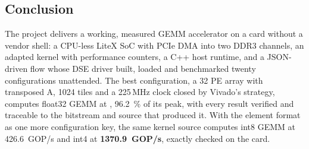 \subsection{Conclusion}
The project delivers a working, measured GEMM accelerator on a card without a vendor shell: a CPU-less LiteX SoC
with PCIe DMA into two DDR3 channels, an adapted  kernel with performance counters, a C++ host
runtime, and a JSON-driven flow whose DSE driver built, loaded and benchmarked twenty configurations unattended. The
best configuration, a 32 PE array with transposed A, 1024 tiles and a 225\,MHz clock closed by Vivado's
 strategy, computes float32 GEMM at \textbf{}, \SI{96.2}{\percent} of its peak, with
every result verified and traceable to the bitstream and source that produced it. With the element format as one
more configuration key, the same kernel source computes int8 GEMM at \SI{426.6}{GOP/s} and int4 at
\textbf{\SI{1370.9}{GOP/s}}, exactly checked on the card.
